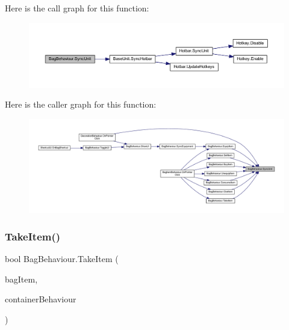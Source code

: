 Here is the call graph for this function\+:
\nopagebreak
\begin{figure}[H]
\begin{center}
\leavevmode
\includegraphics[width=350pt]{class_bag_behaviour_a1ab1c5f24022bf503ad3d3a18387515f_cgraph}
\end{center}
\end{figure}
Here is the caller graph for this function\+:
\nopagebreak
\begin{figure}[H]
\begin{center}
\leavevmode
\includegraphics[width=350pt]{class_bag_behaviour_a1ab1c5f24022bf503ad3d3a18387515f_icgraph}
\end{center}
\end{figure}
\mbox{\label{class_bag_behaviour_a0cde4989737c537ca94730cc690d6780}} 
\subsubsection{\texorpdfstring{TakeItem()}{TakeItem()}}
{\footnotesize\ttfamily bool Bag\+Behaviour.\+Take\+Item (\begin{DoxyParamCaption}\item[{\mbox{\hyperlink{class_bag_item_behaviour}{Bag\+Item\+Behaviour}}}]{bag\+Item,  }\item[{\mbox{\hyperlink{class_container_behaviour}{Container\+Behaviour}}}]{container\+Behaviour }\end{DoxyParamCaption})}

